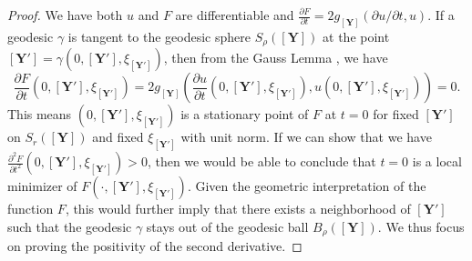 \documentclass[11pt]{article}
\newcommand{\0}{{\mathbf{0}}}
\newcommand{\1}{{\mathbf{1}}}
\newcommand{\Y}{{\mathbf{Y}}}
\begin{document}
\begin{proof}
We have both $u$ and $F$ are differentiable and $\frac{\partial F}{\partial t} = 2 g_{[\Y]}\left( \partial u/\partial t, u  \right) $. If a geodesic $\gamma$ is tangent to the geodesic sphere $S_\rho([\Y])$ at the point $[\Y'] = \gamma(0, [\Y'], \xi_{[\Y']})$, then from the Gauss Lemma \cite[Chapter 3, Lemma 3.5]{do1992riemannian}, we have 
\begin{equation*}
	\frac{\partial F}{\partial t}( 0, [\Y'], \xi_{[\Y']} ) = 2 g_{[\Y]}\left( \frac{\partial u}{\partial t}(0, [\Y'], \xi_{[\Y']}) , u(0, [\Y'], \xi_{[\Y']}) \right) = 0.
\end{equation*} 
This means $(0, [\Y'], \xi_{[\Y']} )$ is a stationary point of $F$ at $t = 0$ for fixed $[\Y']$ on $S_r([\Y])$ and fixed $\xi_{[\Y']}$ with unit norm. If we can show that we have $\frac{\partial^2 F}{\partial t^2}(0,[\Y'], \xi_{[\Y']} ) > 0$, then we would be able to conclude that $t = 0$ is a local minimizer of $F(\cdot, [\Y'], \xi_{[\Y']} )$. Given the geometric interpretation of the function $F$, this would further imply that there exists a neighborhood of $[\Y']$ such that the geodesic $\gamma$ stays out of the geodesic ball $B_\rho([\Y])$. We thus focus on proving the positivity of the second derivative. 


\end{proof}
\end{document}

